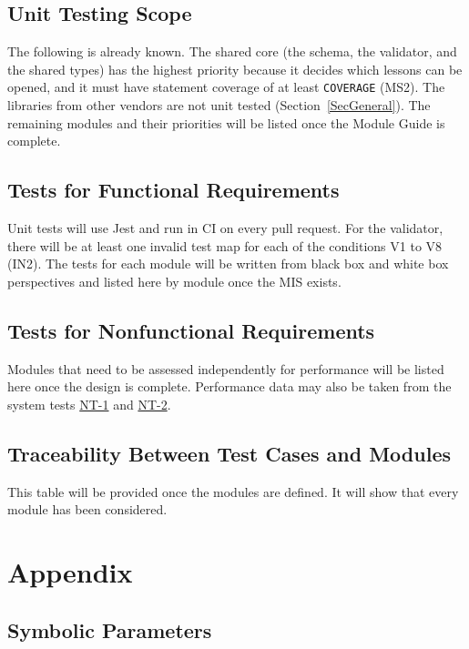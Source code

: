 \documentclass[12pt, titlepage]{article}
\newcommand{\tref}[1]{\hyperlink{test:#1}{#1}}
\newcommand{\cn}[1]{\texttt{#1}}
\begin{document}
\subsection{Unit Testing Scope}

The following is already known. The shared core (the schema, the validator, and
the shared types) has the highest priority because it decides which lessons can
be opened, and it must have statement coverage of at least \cn{COVERAGE} (MS2).
The libraries from other vendors are not unit tested (Section~\ref{SecGeneral}).
The remaining modules and their priorities will be listed once the Module Guide
is complete.

\subsection{Tests for Functional Requirements}

Unit tests will use Jest and run in CI on every pull request. For the validator,
there will be at least one invalid test map for each of the conditions V1 to V8
(IN2). The tests for each module will be written from black box and white box
perspectives and listed here by module once the MIS exists.

\subsection{Tests for Nonfunctional Requirements}

Modules that need to be assessed independently for performance will be listed
here once the design is complete. Performance data may also be taken from the
system tests \tref{NT-1} and \tref{NT-2}.

\subsection{Traceability Between Test Cases and Modules}

This table will be provided once the modules are defined. It will show that every
module has been considered.





\newpage

\section{Appendix}

\subsection{Symbolic Parameters} \label{SecParams}
\end{document}
